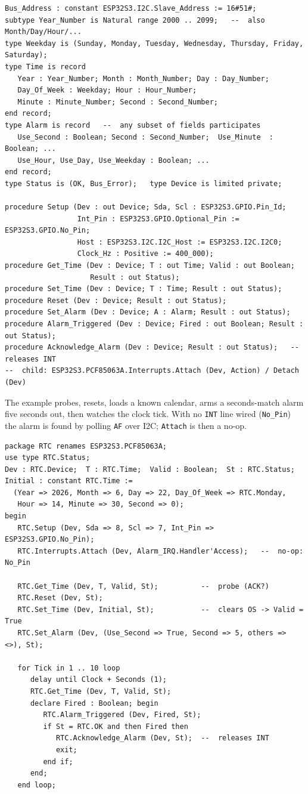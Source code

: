 \begin{lstlisting}
Bus_Address : constant ESP32S3.I2C.Slave_Address := 16#51#;
subtype Year_Number is Natural range 2000 .. 2099;   --  also Month/Day/Hour/...
type Weekday is (Sunday, Monday, Tuesday, Wednesday, Thursday, Friday, Saturday);
type Time is record
   Year : Year_Number; Month : Month_Number; Day : Day_Number;
   Day_Of_Week : Weekday; Hour : Hour_Number;
   Minute : Minute_Number; Second : Second_Number;
end record;
type Alarm is record   --  any subset of fields participates
   Use_Second : Boolean; Second : Second_Number;  Use_Minute  : Boolean; ...
   Use_Hour, Use_Day, Use_Weekday : Boolean; ...
end record;
type Status is (OK, Bus_Error);   type Device is limited private;

procedure Setup (Dev : out Device; Sda, Scl : ESP32S3.GPIO.Pin_Id;
                 Int_Pin : ESP32S3.GPIO.Optional_Pin := ESP32S3.GPIO.No_Pin;
                 Host : ESP32S3.I2C.I2C_Host := ESP32S3.I2C.I2C0;
                 Clock_Hz : Positive := 400_000);
procedure Get_Time (Dev : Device; T : out Time; Valid : out Boolean;
                    Result : out Status);
procedure Set_Time (Dev : Device; T : Time; Result : out Status);
procedure Reset (Dev : Device; Result : out Status);
procedure Set_Alarm (Dev : Device; A : Alarm; Result : out Status);
procedure Alarm_Triggered (Dev : Device; Fired : out Boolean; Result : out Status);
procedure Acknowledge_Alarm (Dev : Device; Result : out Status);   --  releases INT
--  child: ESP32S3.PCF85063A.Interrupts.Attach (Dev, Action) / Detach (Dev)
\end{lstlisting}

The example probes, resets, loads a known calendar, arms a seconds-match alarm five
seconds out, then watches the clock tick. With no \texttt{INT} line wired
(\texttt{No\_Pin}) the alarm is found by polling \texttt{AF} over I2C;
\texttt{Attach} is then a no-op.

\begin{lstlisting}
package RTC renames ESP32S3.PCF85063A;
use type RTC.Status;
Dev : RTC.Device;  T : RTC.Time;  Valid : Boolean;  St : RTC.Status;
Initial : constant RTC.Time :=
  (Year => 2026, Month => 6, Day => 22, Day_Of_Week => RTC.Monday,
   Hour => 14, Minute => 30, Second => 0);
begin
   RTC.Setup (Dev, Sda => 8, Scl => 7, Int_Pin => ESP32S3.GPIO.No_Pin);
   RTC.Interrupts.Attach (Dev, Alarm_IRQ.Handler'Access);   --  no-op: No_Pin

   RTC.Get_Time (Dev, T, Valid, St);          --  probe (ACK?)
   RTC.Reset (Dev, St);
   RTC.Set_Time (Dev, Initial, St);           --  clears OS -> Valid = True
   RTC.Set_Alarm (Dev, (Use_Second => True, Second => 5, others => <>), St);

   for Tick in 1 .. 10 loop
      delay until Clock + Seconds (1);
      RTC.Get_Time (Dev, T, Valid, St);
      declare Fired : Boolean; begin
         RTC.Alarm_Triggered (Dev, Fired, St);
         if St = RTC.OK and then Fired then
            RTC.Acknowledge_Alarm (Dev, St);  --  releases INT
            exit;
         end if;
      end;
   end loop;
\end{lstlisting}

